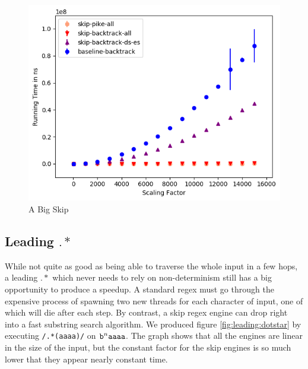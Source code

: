 \begin{figure}
\caption{A Big Skip}
\label{fig:a:big:skip}

\includegraphics{resources/a-big-skip.png}
\end{figure}

\subsection{Leading $.*$}

While not quite as good as being able to traverse the whole input
in a few hops, a leading $.*$ which never needs to rely on non-determinism
still has a big opportunity to produce a speedup.
A standard regex must go through the expensive process of spawning
two new threads for each character of input, one of which will die after
each step. By contrast, a skip regex engine can drop right into a fast substring
search algorithm. We produced figure \ref{fig:leading:dotstar} by executing
\verb'/.*(aaaa)/' on ${\tt b}^n{\tt aaaa}$.
The graph shows that all the engines are linear
in the size of the input, but the constant factor for the skip engines
is so much lower that they appear nearly constant time.

